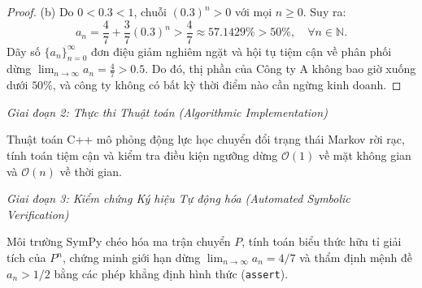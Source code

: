 \documentclass{article}
\begin{document}
\begin{proof}
	(b) Do $0 < 0.3 < 1$, chuỗi $(0.3)^n > 0$ với mọi $n \ge 0$. Suy ra:
	\begin{equation*}
		a_n = \frac{4}{7} + \frac{3}{7}(0.3)^n > \frac{4}{7} \approx 57.1429\% > 50\%, \quad \forall n \in \mathbb{N}.
	\end{equation*}
	Dãy số $\{a_n\}_{n=0}^\infty$ đơn điệu giảm nghiêm ngặt và hội tụ tiệm cận về phân phối dừng $\lim_{n\to\infty} a_n = \frac{4}{7} > 0.5$. Do đó, thị phần của Công ty A không bao giờ xuống dưới $50\%$, và công ty không có bất kỳ thời điểm nào cần ngừng kinh doanh.
\end{proof}

\vspace{0.5em}\noindent\emph{Giai đoạn 2: Thực thi Thuật toán (Algorithmic Implementation)}

Thuật toán C++ mô phỏng động lực học chuyển đổi trạng thái Markov rời rạc, tính toán tiệm cận và kiểm tra điều kiện ngưỡng dừng $\mathcal{O}(1)$ về mặt không gian và $\mathcal{O}(n)$ về thời gian.



\vspace{0.5em}\noindent\emph{Giai đoạn 3: Kiểm chứng Ký hiệu Tự động hóa (Automated Symbolic Verification)}

Môi trường \textsf{SymPy} chéo hóa ma trận chuyển $P$, tính toán biểu thức hữu tỉ giải tích của $P^n$, chứng minh giới hạn dừng $\lim_{n\to\infty} a_n = 4/7$ và thẩm định mệnh đề $a_n > 1/2$ bằng các phép khẳng định hình thức (\texttt{assert}).


\end{document}
